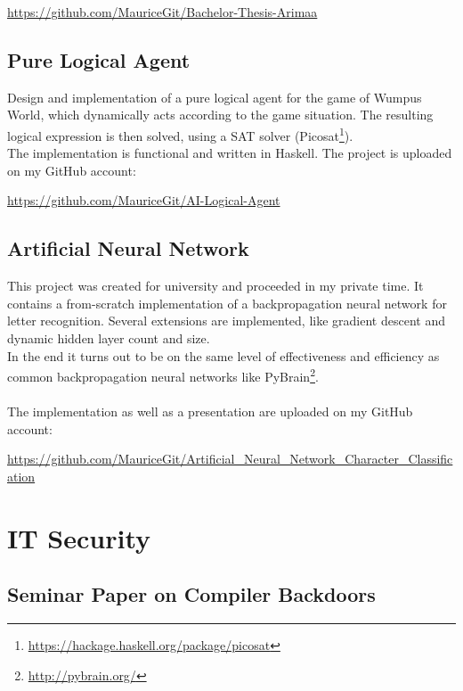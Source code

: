 \documentclass[a4paper, 12pt]{article}
\begin{document}
\begin{center}
	\url{https://github.com/MauriceGit/Bachelor-Thesis-Arimaa}
\end{center}

\subsection{Pure Logical Agent}

Design and implementation of a pure logical agent for the game of Wumpus World, which dynamically acts according
to the game situation. The resulting logical expression is then solved, using a SAT solver 
(Picosat\footnote{\url{https://hackage.haskell.org/package/picosat}}).
\\
The implementation is functional and written in Haskell. The project is uploaded on my GitHub account:

\begin{center}
	\url{https://github.com/MauriceGit/AI-Logical-Agent}
\end{center}

\subsection{Artificial Neural Network}

This project was created for university and proceeded in my private time. It contains a from-scratch implementation
of a backpropagation neural network for letter recognition. Several extensions are implemented, like 
gradient descent and dynamic hidden layer count and size.
\\
In the end it turns out to be on the same level of effectiveness and efficiency as common backpropagation neural networks
like PyBrain\footnote{\url{http://pybrain.org/}}.
\\
\\
The implementation as well as a presentation are uploaded on my GitHub account:

\begin{center}
	\url{https://github.com/MauriceGit/Artificial_Neural_Network_Character_Classification}
\end{center}

\section{IT Security}

\subsection{Seminar Paper on Compiler Backdoors}
\end{document}

